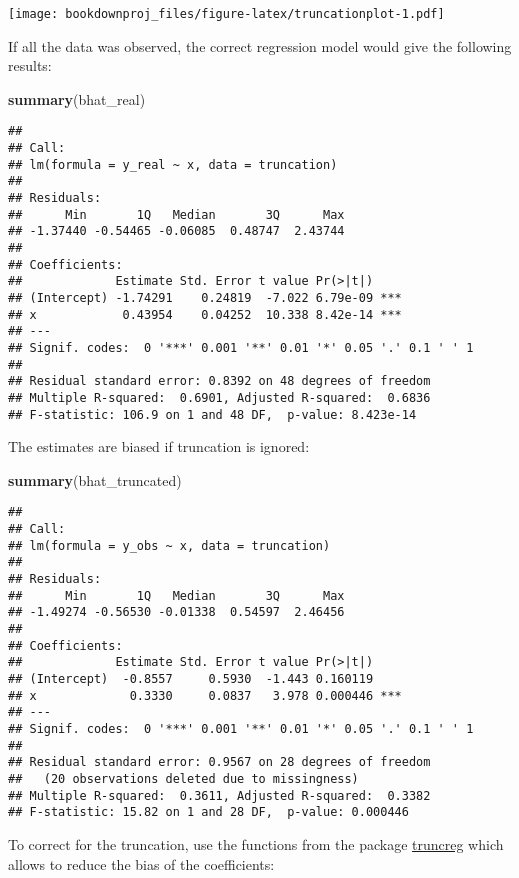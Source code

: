 \documentclass[
]{article}
\newenvironment{Shaded}{\begin{snugshade}}{\end{snugshade}}
\newcommand{\KeywordTok}[1]{\textcolor[rgb]{0.13,0.29,0.53}{\textbf{#1}}}
\newcommand{\NormalTok}[1]{#1}
\begin{document}
\texttt{[image: bookdownproj\_files/figure-latex/truncationplot-1.pdf]}

If all the data was observed, the correct regression model would give the following results:

\begin{Shaded}
\begin{Highlighting}[]
\KeywordTok{summary}\NormalTok{(bhat_real)}
\end{Highlighting}
\end{Shaded}

\begin{verbatim}
## 
## Call:
## lm(formula = y_real ~ x, data = truncation)
## 
## Residuals:
##      Min       1Q   Median       3Q      Max 
## -1.37440 -0.54465 -0.06085  0.48747  2.43744 
## 
## Coefficients:
##             Estimate Std. Error t value Pr(>|t|)    
## (Intercept) -1.74291    0.24819  -7.022 6.79e-09 ***
## x            0.43954    0.04252  10.338 8.42e-14 ***
## ---
## Signif. codes:  0 '***' 0.001 '**' 0.01 '*' 0.05 '.' 0.1 ' ' 1
## 
## Residual standard error: 0.8392 on 48 degrees of freedom
## Multiple R-squared:  0.6901, Adjusted R-squared:  0.6836 
## F-statistic: 106.9 on 1 and 48 DF,  p-value: 8.423e-14
\end{verbatim}

The estimates are biased if truncation is ignored:

\begin{Shaded}
\begin{Highlighting}[]
\KeywordTok{summary}\NormalTok{(bhat_truncated)}
\end{Highlighting}
\end{Shaded}

\begin{verbatim}
## 
## Call:
## lm(formula = y_obs ~ x, data = truncation)
## 
## Residuals:
##      Min       1Q   Median       3Q      Max 
## -1.49274 -0.56530 -0.01338  0.54597  2.46456 
## 
## Coefficients:
##             Estimate Std. Error t value Pr(>|t|)    
## (Intercept)  -0.8557     0.5930  -1.443 0.160119    
## x             0.3330     0.0837   3.978 0.000446 ***
## ---
## Signif. codes:  0 '***' 0.001 '**' 0.01 '*' 0.05 '.' 0.1 ' ' 1
## 
## Residual standard error: 0.9567 on 28 degrees of freedom
##   (20 observations deleted due to missingness)
## Multiple R-squared:  0.3611, Adjusted R-squared:  0.3382 
## F-statistic: 15.82 on 1 and 28 DF,  p-value: 0.000446
\end{verbatim}

To correct for the truncation, use the functions from the package \href{https://cran.r-project.org/web/packages/truncreg/index.html}{truncreg} which allows to reduce the bias of the coefficients:
\end{document}
